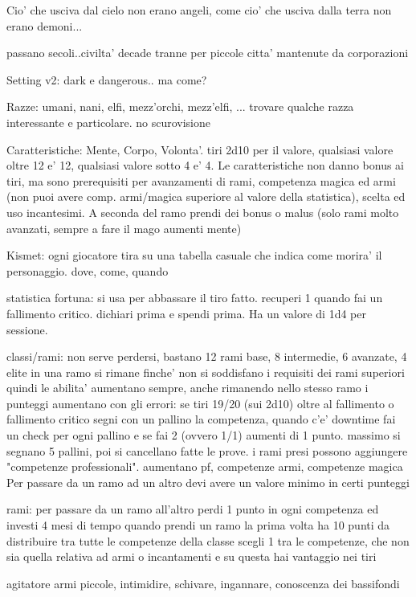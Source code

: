 \documentclass[12pt,a4paper,twoside,openany,twocolumn]{book}
\begin{document}
Cio' che usciva dal cielo non erano angeli, come cio' che usciva dalla terra non erano demoni...

passano secoli..civilta' decade tranne per piccole citta' mantenute da corporazioni


Setting v2: dark e dangerous.. ma come?


Razze: umani, nani, elfi, mezz'orchi, mezz'elfi, ... trovare qualche razza interessante e particolare. no scurovisione

Caratteristiche: Mente, Corpo, Volonta'. tiri 2d10 per il valore, qualsiasi valore oltre 12 e' 12, qualsiasi valore sotto 4 e' 4.
Le caratteristiche non danno bonus ai tiri, ma sono prerequisiti per avanzamenti di rami, competenza magica ed armi (non puoi avere comp. armi/magica superiore al valore della statistica), scelta ed uso incantesimi. A seconda del ramo prendi dei bonus o malus (solo rami molto avanzati, sempre a fare il mago aumenti mente)


Kismet: ogni giocatore tira su una tabella casuale che indica come morira' il personaggio. dove, come, quando

statistica fortuna: si usa per abbassare il tiro fatto. recuperi 1 quando fai un fallimento critico. dichiari prima e spendi prima.
Ha un valore di 1d4 per sessione.

classi/rami: non serve perdersi, bastano 12 rami base, 8 intermedie, 6 avanzate, 4 elite
in una ramo si rimane finche' non si soddisfano i requisiti dei rami superiori
quindi le abilita' aumentano sempre, anche rimanendo nello stesso ramo
i punteggi aumentano con gli errori: se tiri 19/20 (sui 2d10) oltre al fallimento o fallimento critico segni con un pallino la competenza, quando c'e' downtime fai un check per ogni pallino e se fai 2 (ovvero 1/1) aumenti di 1 punto. massimo si segnano 5 pallini, poi si cancellano fatte le prove.
i rami presi possono aggiungere "competenze professionali". aumentano pf, competenze armi, competenze magica Per passare da un ramo ad un altro devi avere un valore minimo in certi punteggi

rami: 
per passare da un ramo all'altro perdi 1 punto in ogni competenza ed investi 4 mesi di tempo
quando prendi un ramo la prima volta ha 10 punti da distribuire tra tutte le competenze della classe
scegli 1 tra le competenze, che non sia quella relativa ad armi o incantamenti e su questa hai vantaggio nei tiri

agitatore
armi piccole, intimidire, schivare, ingannare, conoscenza dei bassifondi
\end{document}
